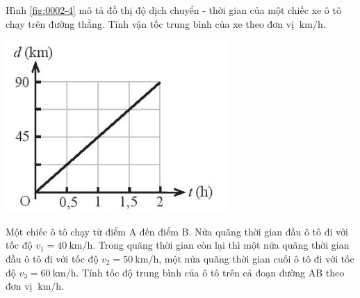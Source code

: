 \begin{ex}
	Hình \ref{fig:0002-4} mô tả đồ thị độ dịch chuyển - thời gian của một chiếc xe ô tô chạy trên đường thẳng. Tính vận tốc trung bình của xe theo đơn vị $\SI{}{\kilo\meter/\hour}$.
	\begin{center}
		\includegraphics[scale=0.6]{figs/G10Y25B5-7}
		\label{fig:0002-4}
	\end{center}
\end{ex}

\begin{ex}
	Một chiếc ô tô chạy từ điểm A đến điểm B. Nửa quãng thời gian đầu ô tô đi với tốc độ $v_1=\SI{40}{\kilo\meter/\hour}$. Trong quãng thời gian còn lại thì một nửa quãng thời gian đầu ô tô đi với tốc độ $v_2=\SI{50}{\kilo\meter/\hour}$, một nửa quãng thời gian cuối ô tô đi với tốc độ $v_3=\SI{60}{\kilo\meter/\hour}$. Tính tốc độ trung bình của ô tô trên cả đoạn đường AB theo đơn vị $\SI{}{\kilo\meter/\hour}$.
\end{ex}

